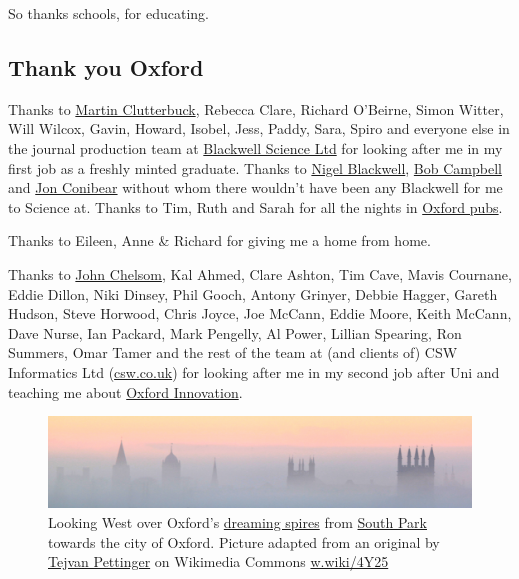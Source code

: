 \documentclass[
]{book}
\begin{document}
So thanks schools, for educating. 🙏

\hypertarget{oxford}{%
\subsection{Thank you Oxford}\label{oxford}}

Thanks to \href{https://shabash.net/about}{Martin Clutterbuck}, Rebecca Clare, Richard O'Beirne, Simon Witter, Will Wilcox, Gavin, Howard, Isobel, Jess, Paddy, Sara, Spiro and everyone else in the journal production team at \href{https://www.flickr.com/photos/dullhunk/4042838703}{Blackwell Science Ltd} for looking after me in my first job as a freshly minted graduate. Thanks to \href{https://find-and-update.company-information.service.gov.uk/officers/bhikqaOvDcqoeBx4ADdYbmM9OJk/appointments}{Nigel Blackwell}, \href{https://find-and-update.company-information.service.gov.uk/officers/eKDez4M2z_A_ASdhMSFPyYA7AxE/appointments}{Bob Campbell} and \href{https://find-and-update.company-information.service.gov.uk/officers/FMl8qqZCrsq8NHF_rbCdx_3TQR4/appointments}{Jon Conibear} without whom there wouldn't have been any Blackwell for me to Science at. Thanks to Tim, Ruth and Sarah for all the nights in \href{https://www.flickr.com/photos/dullhunk/3947383855}{Oxford pubs}.

Thanks to Eileen, Anne \& Richard for giving me a home from home.

Thanks to \href{https://www.fordham.edu/info/30585/ms_in_applied_health_informatics_faculty}{John Chelsom}, Kal Ahmed, Clare Ashton, Tim Cave, Mavis Cournane, Eddie Dillon, Niki Dinsey, Phil Gooch, Antony Grinyer, Debbie Hagger, Gareth Hudson, Steve Horwood, Chris Joyce, Joe McCann, Eddie Moore, Keith McCann, Dave Nurse, Ian Packard, Mark Pengelly, Al Power, Lillian Spearing, Ron Summers, Omar Tamer and the rest of the team at (and clients of) CSW Informatics Ltd (\href{https://csw.co.uk/}{csw.co.uk}) for looking after me in my second job after Uni and teaching me about \href{https://oxin-centres.co.uk/}{Oxford Innovation}.

\begin{figure}

{\centering \includegraphics[width=1\linewidth]{images/dreaming-spires-oxford-sunrise} 

}

\caption{Looking West over Oxford's \href{https://en.wikipedia.org/wiki/Thyrsis_(poem)}{dreaming spires} from \href{https://en.wikipedia.org/wiki/South_Park,_Oxford}{South Park} towards the city of Oxford. Picture adapted from an original by \href{https://en.wikipedia.org/wiki/Tejvan_Pettinger}{Tejvan Pettinger} on Wikimedia Commons \href{https://w.wiki/4Y25}{w.wiki/4Y25}}\label{fig:oxford-fig}
\end{figure}
\end{document}
